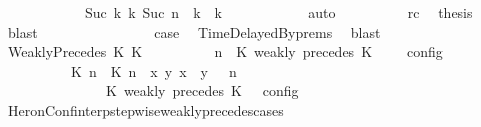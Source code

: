 \begin{isabellebody}
\ \ \ \ \ \ \ \ \ \ \ \ {\isasymhookrightarrow}\isactrlbsup Suc\ k\isactrlesup \ {\isacharparenleft}{\isasymGamma}\isactrlsub k{\isacharcomma}\ Suc\ n\ {\isasymturnstile}\ {\isasymPsi}\isactrlsub k\ {\isasymtriangleright}\ {\isasymPhi}\isactrlsub k{\isacharparenright}{\isacartoucheclose}\isanewline
\ \ \ \ \ \ \ \ \ \ \isamarkupfalse%
\ auto\isanewline
\ \ \ \ \ \ \ \ \isamarkupfalse%
\ rc\ \isamarkupfalse%
\ {\isacharquery}thesis\ \isamarkupfalse%
\ blast\isanewline
\ \ \ \ \ \ \isamarkupfalse%
\isanewline
\ \ \ \ \ \ \isamarkupfalse%
\ \isamarkupfalse%
\ {\isacharquery}case\ \isamarkupfalse%
\ TimeDelayedBy{\isachardot}prems{\isacharparenleft}{}{\isacharparenright}\ \isamarkupfalse%
\ blast\isanewline
\ \ \isamarkupfalse%
\isanewline
\ \ \ \ \isamarkupfalse%
\ {\isacharparenleft}WeaklyPrecedes\ K\ K\isanewline
\ \ \ \ \ \ \isamarkupfalse%
\ {\isacartoucheopen}{\isasymlbrakk}\ {\isasymGamma}{\isacharcomma}\ n\ {\isasymturnstile}\ {\isacharparenleft}{\isacharparenleft}K\ weakly\ precedes\ K\ {\isacharhash}\ {\isasymPsi}{\isacharparenright}\ {\isasymtriangleright}\ {\isasymPhi}\ {\isasymrbrakk}\isactrlsub c\isactrlsub o\isactrlsub n\isactrlsub f\isactrlsub i\isactrlsub g\ {\isacharequal}\isanewline
\ \ \ \ \ \ \ \ {\isasymlbrakk}\ {\isacharparenleft}{\isacharparenleft}{\isasymlceil}{\isacharhash}\isactrlsup {\isasymle}\ K\ n{\isacharcomma}\ {\isacharhash}\isactrlsup {\isasymle}\ K\ n{\isasymrceil}\ {\isasymin}\ {\isacharparenleft}{\isasymlambda}{\isacharparenleft}x{\isacharcomma}\ y{\isacharparenright}{\isachardot}\ x\ {\isasymle}\ y{\isacharparenright}{\isacharparenright}\ {\isacharhash}\ {\isasymGamma}{\isacharparenright}{\isacharcomma}\ n\isanewline
\ \ \ \ \ \ \ \ \ \ \ \ {\isasymturnstile}\ {\isasymPsi}\ {\isasymtriangleright}\ {\isacharparenleft}{\isacharparenleft}K\ weakly\ precedes\ K\ {\isacharhash}\ {\isasymPhi}{\isacharparenright}\ {\isasymrbrakk}\isactrlsub c\isactrlsub o\isactrlsub n\isactrlsub f\isactrlsub i\isactrlsub g{\isacartoucheclose}\isanewline
\ \ \ \ \ \ \ \ \isamarkupfalse%
\ HeronConf{\isacharunderscore}interp{\isacharunderscore}stepwise{\isacharunderscore}weakly{\isacharunderscore}precedes{\isacharunderscore}cases\ \isamarkupfalse%

\end{isabellebody}
